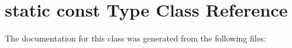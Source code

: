 \hypertarget{classstatic_01const_01Type}{}\section{static const Type Class Reference}
\label{classstatic_01const_01Type}


The documentation for this class was generated from the following files\+: